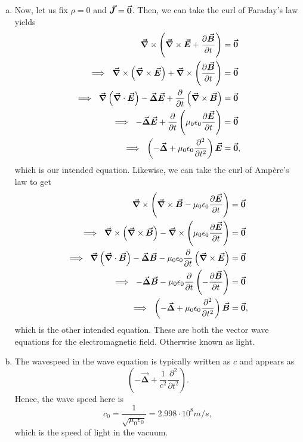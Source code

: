 \documentclass[12pt]{article} %
\newcommand{\vecfieldB}{\boldsymbol{\vec{B}}}
\newcommand{\vecfieldJ}{\boldsymbol{\vec{J}}}
\newcommand{\veclaplace}{\boldsymbol{\vec{\Delta}}}
\begin{document}
\begin{solution}
\begin{enumerate}[(a)]
    \item Now, let us fix $\rho=0$ and $\vecfieldJ=\zerovec$.  Then, we can take the curl of Faraday's law yields
        \begin{align*}
            \grad \times \left(\grad \times \vecfieldE +  \frac{\partial \vecfieldB}{\partial t} \right) &=\zerovec\\
            \implies ~ \grad \times \left(\grad \times \vecfieldE\right) + \grad \times \left(\frac{\partial \vecfieldB}{\partial t} \right)&=\zerovec \\
            \implies ~ \grad \left( \grad \cdot \vecfieldE\right)-\veclaplace \vecfieldE + \frac{\partial}{\partial t} \left( \grad \times \vecfieldB\right)&=\zerovec\\
            \implies ~ -\veclaplace \vecfieldE +  \frac{\partial}{\partial t} \left(\mu_0 \epsilon_0 \frac{\partial \vecfieldE}{\partial t}\right) &= \zerovec\\
            \implies ~ \left( - \veclaplace + \mu_0 \epsilon_0 \frac{\partial^2 }{\partial t^2}\right) \vecfieldE &= \zerovec,
        \end{align*}
        which is our intended equation.  Likewise, we can take the curl of Amp\`ere's law to get
    \begin{align*}
        \grad \times \left(\grad \times \vecfieldB - \mu_0 \epsilon_0 \frac{\partial \vecfieldE}{\partial t} \right) &=\zerovec\\
        \implies ~ \grad \times \left(\grad \times \vecfieldB\right) - \grad \times \left(\mu_0 \epsilon_0\frac{\partial \vecfieldE}{\partial t} \right)&=\zerovec \\
        \implies ~ \grad \left( \grad \cdot \vecfieldB\right)-\veclaplace \vecfieldB - \mu_0\epsilon_0\frac{\partial}{\partial t} \left( \grad \times \vecfieldE\right)&=\zerovec\\
        \implies ~ -\veclaplace \vecfieldB - \mu_0 \epsilon_0 \frac{\partial}{\partial t} \left(-\frac{\partial \vecfieldB}{\partial t}\right) &= \zerovec\\
        \implies ~ \left( - \veclaplace + \mu_0 \epsilon_0 \frac{\partial^2 }{\partial t^2}\right) \vecfieldB &= \zerovec,
    \end{align*}
    which is the other intended equation. These are both the vector wave equations for the electromagnetic field. Otherwise known as light.
    
    \item The wavespeed in the wave equation is typically written as $c$ and appears as
    \[
    \left( - \veclaplace + \frac{1}{c^2} \frac{\partial^2 }{\partial t^2}\right).
    \]
    Hence, the wave speed here is
    \[
    c_0 = \frac{1}{\sqrt{\mu_0\epsilon_0}} = 2.998 \cdot 10^8 m/s,
    \]
    which is the speed of light in the vacuum.
\end{enumerate}
\end{solution}
\end{document}
